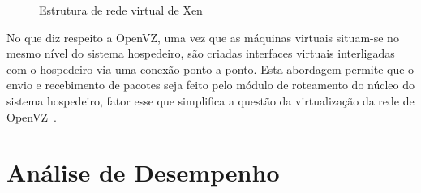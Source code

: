 \documentclass[12pt]{article}
\begin{document}
\begin{figure}[!htb]
\centering
{}
\caption{Estrutura de rede virtual de Xen ~\cite{menon2006onv}}
\label{fig:xen_net}
\end{figure}

No que diz respeito a OpenVZ, uma vez que as máquinas virtuais situam-se no mesmo nível do sistema hospedeiro, são criadas interfaces virtuais interligadas com o hospedeiro via uma conexão ponto-a-ponto. Esta abordagem permite que o envio e recebimento de pacotes seja feito pelo módulo de roteamento do núcleo do sistema hospedeiro, fator esse que simplifica a questão da virtualização da rede de OpenVZ~\cite{openvz}.


\section{Análise de Desempenho}\label{s:desempenho}

\end{document}
